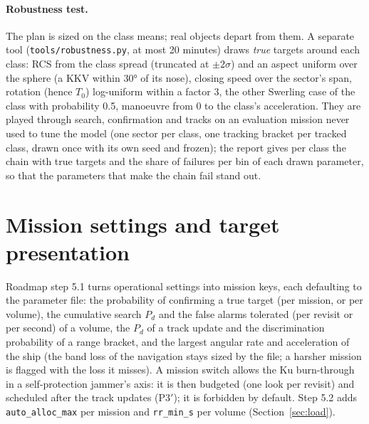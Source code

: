 \documentclass[11pt,a4paper]{article}
\newcommand{\code}[1]{\texttt{\small #1}}
\begin{document}
\paragraph{Robustness test.} The plan is sized on the class means; real objects depart from them. A separate tool
(\code{tools/robustness.py}, at most 20 minutes) draws \emph{true} targets around each class: RCS from the class spread
(truncated at $\pm2\sigma$) and an aspect uniform over the sphere (a KKV within \ang{30} of its nose), closing speed over
the sector's span, rotation (hence $T_0$) log-uniform within a factor 3, the other Swerling case of the class with
probability 0.5, manoeuvre from 0 to the class's acceleration. They are played through search, confirmation and
tracks on an evaluation mission never used to tune the model (one sector per class, one tracking bracket per tracked
class, drawn once with its own seed and frozen); the report gives per class the chain with true targets and the share of failures per bin of each drawn
parameter, so that the parameters that make the chain fail stand out.

\section{Mission settings and target presentation}\label{sec:mission51}
Roadmap step 5.1 turns operational settings into mission keys, each defaulting to the parameter file: the probability
of confirming a true target (per mission, or per volume), the cumulative search $P_d$ and the false alarms tolerated
(per revisit or per second) of a volume, the $P_d$ of a track update and the discrimination probability of a range
bracket, and the largest angular rate and acceleration of the ship (the band loss of the navigation stays sized by the
file; a harsher mission is flagged with the loss it misses). A mission switch allows the Ku burn-through in a
self-protection jammer's axis: it is then budgeted (one look per revisit) and scheduled after the track updates (P3$'$);
it is forbidden by default. Step 5.2 adds \code{auto\_alloc\_max} per mission and \code{rr\_min\_s} per volume
(Section~\ref{sec:load}).
\end{document}
